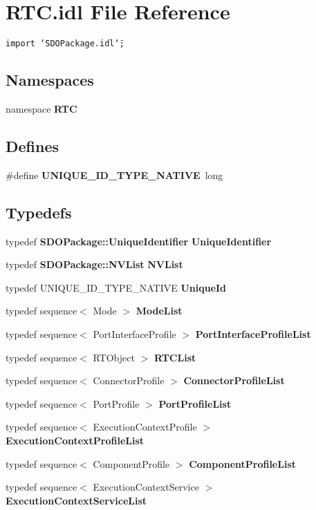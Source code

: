 \section{RTC.idl File Reference}
\label{RTC_8idl}
{\tt import \char`\"{}SDOPackage.idl\char`\"{};}\par
\subsection*{Namespaces}
\begin{CompactItemize}
\item 
namespace {\bf RTC}
\end{CompactItemize}
\subsection*{Defines}
\begin{CompactItemize}
\item 
\#define {\bf UNIQUE\_\-ID\_\-TYPE\_\-NATIVE}~long
\end{CompactItemize}
\subsection*{Typedefs}
\begin{CompactItemize}
\item 
typedef {\bf SDOPackage::Unique\-Identifier} {\bf Unique\-Identifier}
\item 
typedef {\bf SDOPackage::NVList} {\bf NVList}
\item 
typedef UNIQUE\_\-ID\_\-TYPE\_\-NATIVE {\bf Unique\-Id}
\item 
typedef sequence$<$ Mode $>$ {\bf Mode\-List}
\item 
typedef sequence$<$ Port\-Interface\-Profile $>$ {\bf Port\-Interface\-Profile\-List}
\item 
typedef sequence$<$ RTObject $>$ {\bf RTCList}
\item 
typedef sequence$<$ Connector\-Profile $>$ {\bf Connector\-Profile\-List}
\item 
typedef sequence$<$ Port\-Profile $>$ {\bf Port\-Profile\-List}
\item 
typedef sequence$<$ Execution\-Context\-Profile $>$ {\bf Execution\-Context\-Profile\-List}
\item 
typedef sequence$<$ Component\-Profile $>$ {\bf Component\-Profile\-List}
\item 
typedef sequence$<$ Execution\-Context\-Service $>$ {\bf Execution\-Context\-Service\-List}
\end{CompactItemize}
